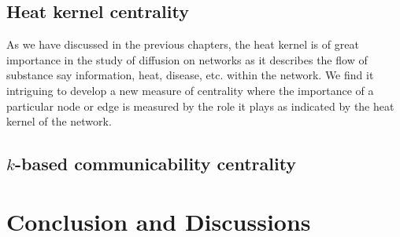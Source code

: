 \documentclass[10pt,a4paper]{article}
\theoremstyle{plain}
\theoremstyle{definition}
\begin{document}
\subsection{Heat kernel centrality}

As we have discussed in the previous chapters, the heat kernel is of great importance in the study of diffusion on networks as it describes the flow of substance say information, heat, disease, etc. within the network. We find it intriguing to develop a new measure of centrality where the importance of a particular node or edge is measured by the role it plays as indicated by the heat kernel of the network.

\subsection{$k$-based communicability centrality} 

\newpage
\section{Conclusion and Discussions}
\newpage
\renewcommand{\bibname}{References}
\nocite{*}


\end{document}
